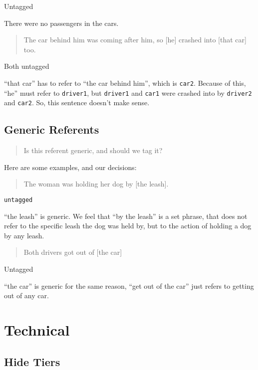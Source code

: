 \documentclass[
]{book}
\begin{document}
Untagged

There were no passengers in the cars.

\begin{quote}
The car behind him was coming after him,
so {[}he{]} crashed into {[}that car{]} too.
\end{quote}

Both untagged

``that car'' has to refer to ``the car behind him'', which is \texttt{car2}.
Because of this, ``he'' must refer to \texttt{driver1},
but \texttt{driver1} and \texttt{car1} were crashed into by \texttt{driver2} and \texttt{car2}.
So, this sentence doesn't make sense.

\hypertarget{generic-referents}{%
\subsection{Generic Referents}\label{generic-referents}}

\begin{quote}
Is this referent generic, and should we tag it?
\end{quote}

Here are some examples, and our decisions:

\begin{quote}
The woman was holding her dog by {[}the leash{]}.
\end{quote}

\texttt{untagged}

``the leash'' is generic.
We feel that ``by the leash'' is a set phrase,
that does not refer to the specific leash the dog was held by,
but to the action of holding a dog by any leash.

\begin{quote}
Both drivers got out of {[}the car{]}
\end{quote}

Untagged

``the car'' is generic for the same reason,
``get out of the car'' just refers to getting out of any car.

\hypertarget{technical}{%
\section{Technical}\label{technical}}

\hypertarget{hide-tiers}{%
\subsection{Hide Tiers}\label{hide-tiers}}
\end{document}
